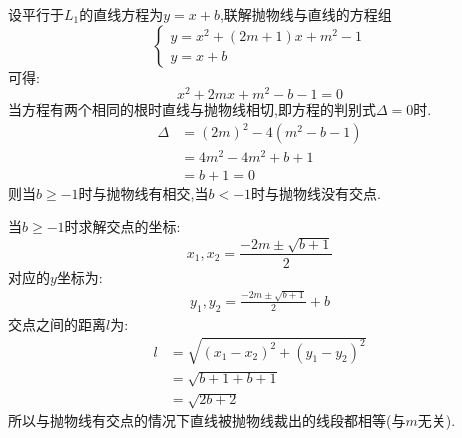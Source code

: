 \begin{questions}
\begin{solution}
\begin{penum}
			\item 设平行于$L_1$的直线方程为$y=x + b$,联解抛物线与直线的方程组
			      \begin{equation*}
				      \begin{cases}
					      y=x^2 + (2m+1)x + m^2 - 1 \\
					      y = x + b
				      \end{cases}
			      \end{equation*}
			      可得:
			      \begin{equation*}
				      x^2 + 2mx + m^2 - b - 1 = 0
			      \end{equation*}
			      当方程有两个相同的根时直线与抛物线相切,即方程的判别式$\Delta=0$时.
			      \begin{align*}
				      \Delta & = (2m)^2 - 4(m^2 - b - 1) \\
				             & = 4m^2 - 4m^2 + b + 1     \\
				             & = b + 1 = 0
			      \end{align*}
			      则当$b\geqslant-1$时与抛物线有相交,当$b<-1$时与抛物线没有交点.

			      当$b\geqslant-1$时求解交点的坐标:
			      \begin{equation*}
				      x_1,x_2 = \frac{-2m \pm \sqrt{b + 1}}{2}
			      \end{equation*}
			      对应的$y$坐标为:
			      \begin{align*}
				      y_1,y_2 = \frac{-2m \pm \sqrt{b + 1}}{2} + b
			      \end{align*}
			      交点之间的距离$l$为:
			      \begin{align*}
				      l & = \sqrt{(x_1 - x_2)^2 + (y_1 - y_2)^2} \\
				        & = \sqrt{b + 1 + b + 1}                 \\
				        & = \sqrt{2b + 2}
			      \end{align*}
			      所以与抛物线有交点的情况下直线被抛物线裁出的线段都相等(与$m$无关).

		\end{penum}
	\end{solution}

\end{questions}
